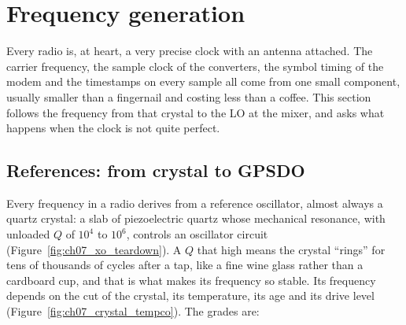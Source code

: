 \section{Frequency generation}
\label{sec:ch07:synth}

Every radio is, at heart, a very precise clock with an antenna attached. The carrier frequency, the
sample clock of the converters, the symbol timing of the modem and the timestamps on every sample
all come from one small component, usually smaller than a fingernail and costing less than a coffee.
This section follows the frequency from that crystal to the LO at the mixer, and asks what happens
when the clock is not quite perfect.

\subsection{References: from crystal to GPSDO}

Every frequency in a radio derives from a reference oscillator, almost always a quartz crystal: a slab
of piezoelectric quartz whose mechanical resonance, with unloaded $Q$ of $10^4$ to $10^6$, controls an
oscillator circuit (Figure~\ref{fig:ch07_xo_teardown}). A $Q$ that high means the crystal ``rings'' for
tens of thousands of cycles after a tap, like a fine wine glass rather than a cardboard cup, and that is
what makes its frequency so stable. Its frequency depends on the cut of the crystal, its temperature,
its age and its drive level (Figure~\ref{fig:ch07_crystal_tempco}). The grades are:


